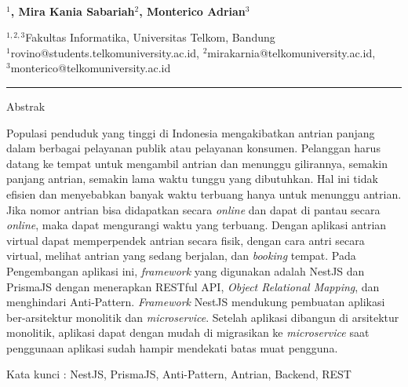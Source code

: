 
  \begin{center}
      \textbf{\large \Title}\\
      \bigskip 
  \end{center}
  
  
  
  \begin{center}
    \bf \Author$^1$, Mira Kania Sabariah$^2$, Monterico Adrian$^3$
  \end{center}
  
  
  \begin{center}
    $^{1,2,3}$Fakultas Informatika, Universitas Telkom, Bandung\\
$^1$rovino@students.telkomuniversity.ac.id, $^2$mirakarnia@telkomuniversity.ac.id,\\ $^3$monterico@telkomuniversity.ac.id
  \end{center}
  
  
  
{\bf \parindent0pt \noindent\rule{\textwidth}{1pt}}
Abstrak

Populasi penduduk yang tinggi di Indonesia mengakibatkan antrian panjang dalam berbagai pelayanan publik atau pelayanan konsumen. Pelanggan harus datang ke tempat untuk mengambil antrian dan menunggu gilirannya, semakin panjang antrian, semakin lama waktu tunggu yang dibutuhkan. Hal ini tidak efisien dan menyebabkan banyak waktu terbuang hanya untuk menunggu antrian. Jika nomor antrian bisa didapatkan secara \textit{online} dan dapat di pantau secara \textit{online}, maka dapat mengurangi waktu yang terbuang. Dengan aplikasi antrian virtual dapat memperpendek antrian secara fisik, dengan cara antri secara virtual, melihat antrian yang sedang berjalan, dan \textit{booking} tempat. Pada Pengembangan aplikasi ini, \textit{framework} yang digunakan adalah NestJS dan PrismaJS dengan menerapkan RESTful API, \textit{Object Relational Mapping}, dan menghindari Anti-Pattern. \textit{Framework} NestJS mendukung pembuatan aplikasi ber-arsitektur monolitik dan \textit{microservice}. Setelah aplikasi dibangun di arsitektur monolitik, aplikasi dapat dengan mudah di migrasikan ke \textit{microservice} saat penggunaan aplikasi sudah hampir mendekati batas muat pengguna.

\bigskip
Kata kunci : NestJS, PrismaJS, Anti-Pattern, Antrian, Backend, REST






